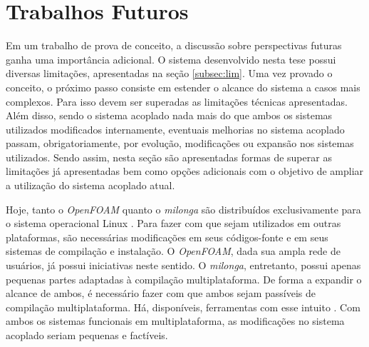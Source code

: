 \section{Trabalhos Futuros}

Em um trabalho de prova de conceito, a discussão sobre perspectivas futuras ganha uma importância adicional.
O sistema desenvolvido nesta tese possui diversas limitações, apresentadas na seção \ref{subsec:lim}. Uma vez
provado o conceito, o próximo passo consiste em estender o alcance do sistema a casos mais complexos. Para
isso devem ser superadas as limitações técnicas apresentadas. Além disso, sendo o sistema acoplado nada
mais do que ambos os sistemas utilizados modificados internamente, eventuais melhorias no sistema acoplado
passam, obrigatoriamente, por evolução, modificações ou expansão nos sistemas utilizados. Sendo assim, nesta seção são apresentadas formas
de superar as limitações já apresentadas bem como opções adicionais com o objetivo de ampliar a utilização
do sistema acoplado atual. 

Hoje, tanto o \textit{OpenFOAM} quanto o \textit{milonga} são distribuídos exclusivamente para o sistema
operacional Linux \cite{LinuxBritannica}. Para fazer com que sejam utilizados em outras plataformas, são necessárias
modificações em seus códigos-fonte e em seus sistemas de compilação e instalação. O \textit{OpenFOAM}, dada sua
ampla rede de usuários, já possui iniciativas neste sentido. O \textit{milonga}, entretanto, possui apenas pequenas partes
adaptadas à compilação multiplataforma. De forma a expandir o alcance de ambos, é necessário fazer com que ambos
sejam passíveis de compilação multiplataforma. Há, disponíveis, ferramentas com esse intuito \cite{Martin2008}. Com ambos os
sistemas funcionais em multiplataforma, as modificações no sistema acoplado seriam pequenas e factíveis.

